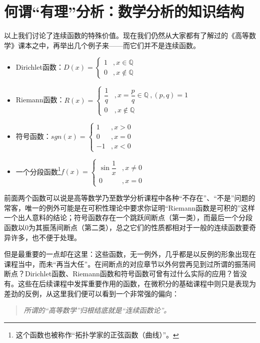 \documentclass[12pt,a4paper]{article}
\begin{document}
	\section{何谓“有理”分析：数学分析的知识结构}{
		以上我们讨论了连续函数的特殊价值。现在我们仍然从大家都有了解过的《高等数学》课本之中，再举出几个例子来——而它们并不是连续函数。
		\begin{itemize}
			\item Dirichlet函数：$D(x)=\begin{cases}
				1 &,x\in \mathbb{Q}\\
				0 &,x\notin \mathbb{Q}
			\end{cases} $
			\item Riemann函数：$R(x)=\begin{cases}
				\dfrac{1}{q} &, x=\dfrac{p}{q}\in \mathbb{Q}~,(p,q)=1\\
				0   &, x\notin \mathbb{Q}
			\end{cases}$
			\item 符号函数：$sgn(x)=\begin{cases}
				1 &  ,x>0 \\
				0 &  ,x=0 \\
				-1 & ,x<0
			\end{cases}$
			\item 一个分段函数\footnote{这个函数也被称作“拓扑学家的正弦函数（曲线）”。}$f(x)=\begin{cases}
				\sin\dfrac{1}{x} & ,x\ne0 \\
				0 & , x=0
			\end{cases}$
			
		\end{itemize}
	
		前面两个函数可以说是高等数学乃至数学分析课程中各种“不存在”、“不是”问题的常客，唯一的例外可能是在可积性理论中要求你证明“Riemann函数是可积的”这样一个出人意料的结论；符号函数存在一个跳跃间断点（第一类），而最后一个分段函数以$0$为其振荡间断点（第二类），总之它们的性质都相对于一般的连续函数要奇异许多，也不便于处理。
		
		但是最重要的一点却在这里：这些函数，无一例外，几乎都是以反例的形象出现在课程当中，而未“再当大任”。在间断点的对应章节以外何尝再见到过所谓的振荡间断点？Dirichlet函数、Riemann函数和符号函数可曾有过什么实际的应用？皆没有。这些在后续课程中发挥重要作用的函数，在微积分的基础课程中则只是表现为差劲的反例，从这里我们便可以看到一个非常强的偏向：
		\begin{quote}\itshape
			所谓的“高等数学”归根结底就是“连续函数论”。
		\end{quote}
		
}
\end{document}
